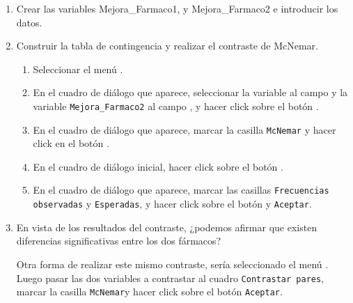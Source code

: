 \begin{enumerate}[leftmargin=*]
\begin{enumerate}
\item Crear las variables \textsf{Mejora\_Farmaco1},
 y \textsf{Mejora\_Farmaco2} e introducir los datos.
\item Construir la tabla de contingencia y realizar el contraste de McNemar.
\begin{indicacion}
\begin{enumerate}
\item Seleccionar el menú .
\item En el cuadro de diálogo que aparece, seleccionar la variable  al campo  y la variable \texttt{Mejora\_Farmaco2} al campo , y hacer click sobre el botón .
\item En el cuadro de diálogo que aparece, marcar la casilla \texttt{McNemar} y hacer click en el botón .
\item En el cuadro de diálogo inicial, hacer click sobre el botón .
\item En el cuadro de diálogo que aparece, marcar las casillas \texttt{Frecuencias observadas} y \texttt{Esperadas}, y hacer click sobre el botón  y \texttt{Aceptar}.
\end{enumerate}
\end{indicacion}

\item En vista de los resultados del contraste, ¿podemos afirmar que existen diferencias significativas entre los dos fármacos?

\begin{indicacion}
Otra forma de realizar este mismo contraste, sería seleccionado el menú . Luego pasar las dos variables a contrastar al cuadro \texttt{Contrastar pares}, marcar la casilla \texttt{McNemar}y hacer click sobre el botón  \texttt{Aceptar}.
\end{indicacion}
\end{enumerate}

\end{enumerate}


